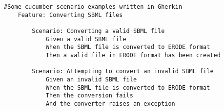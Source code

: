 \begin{lstlisting}[language=Gherkin]
    #Some cucumber scenario examples written in Gherkin
    Feature: Converting SBML files
    
        Scenario: Converting a valid SBML file
            Given a valid SBML file
            When the SBML file is converted to ERODE format
            Then a valid file in ERODE format has been created
            
        Scenario: Attempting to convert an invalid SBML file
            Given an invalid SBML file
            When the SBML file is converted to ERODE format
            Then the conversion fails
            And the converter raises an exception
\end{lstlisting}
